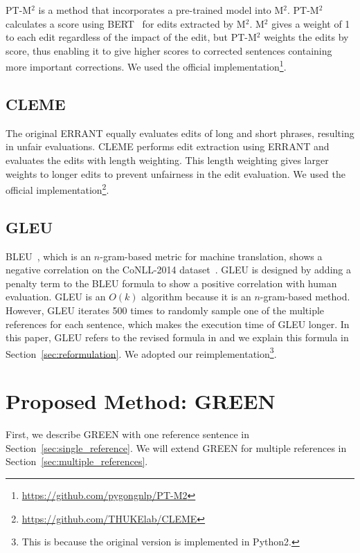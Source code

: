 \documentclass[11pt]{article}
\begin{document}
PT-M${}^2$ is a method that incorporates a pre-trained model into M${}^2$.
PT-M${}^2$ calculates a score using BERT~\citep{devlin-etal-2019-bert} for edits extracted by M${}^2$.
M${}^2$ gives a weight of 1 to each edit regardless of the impact of the edit, but PT-M${}^2$ weights the edits by score, thus enabling it to give higher scores to corrected sentences containing more important corrections.
We used the official implementation\footnote{\url{https://github.com/pygongnlp/PT-M2}}.

\subsection{CLEME~\citep{ye-etal-2023-cleme}}
\label{sec:cleme}

The original ERRANT equally evaluates edits of long and short phrases, resulting in unfair evaluations.
CLEME performs edit extraction using ERRANT and evaluates the edits with length weighting.
This length weighting gives larger weights to longer edits to prevent unfairness in the edit evaluation.
We used the official implementation\footnote{\url{https://github.com/THUKElab/CLEME}}.

\subsection{GLEU~\citep{napoles-etal-2015-ground, napoles2016gleu}}
\label{sec:gleu}

BLEU~\citep{papineni-etal-2002-bleu}, which is an $n$-gram-based metric for machine translation, shows a negative correlation on the CoNLL-2014 dataset~\citep{grundkiewicz-etal-2015-human}.
GLEU is designed by adding a penalty term to the BLEU formula to show a positive correlation with human evaluation.
GLEU is an $O(k)$ algorithm because it is an $n$-gram-based method.
However, GLEU iterates 500 times to randomly sample one of the multiple references for each sentence, which makes the execution time of GLEU longer.
In this paper, GLEU refers to the revised formula in \citet{napoles2016gleu} and we explain this formula in Section~\ref{sec:reformulation}.
We adopted our reimplementation\footnote{This is because the original version is implemented in Python2.}.

\section{Proposed Method: GREEN}
\label{sec:method}

First, we describe GREEN with one reference sentence in Section~\ref{sec:single_reference}.
We will extend GREEN for multiple references in Section~\ref{sec:multiple_references}.
\end{document}

